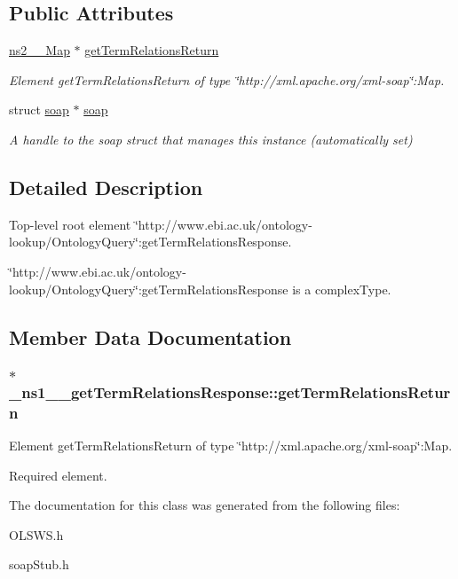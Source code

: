 \subsection*{Public Attributes}
\begin{DoxyCompactItemize}
\item 
\hyperlink{classns2____Map}{ns2\_\-\_\-Map} $\ast$ \hyperlink{class__ns1____getTermRelationsResponse_ad733131f72209f9fa059cc8749f895b4}{getTermRelationsReturn}
\begin{DoxyCompactList}\small\item\em Element getTermRelationsReturn of type \char`\"{}http://xml.apache.org/xml-\/soap\char`\"{}:Map. \end{DoxyCompactList}\item 
\hypertarget{class__ns1____getTermRelationsResponse_a82bf2332fed631a89dd17f31ac99727a}{
struct \hyperlink{class__ns1____getTermRelationsResponse_a82bf2332fed631a89dd17f31ac99727a}{soap} $\ast$ \hyperlink{class__ns1____getTermRelationsResponse_a82bf2332fed631a89dd17f31ac99727a}{soap}}
\label{class__ns1____getTermRelationsResponse_a82bf2332fed631a89dd17f31ac99727a}

\begin{DoxyCompactList}\small\item\em A handle to the soap struct that manages this instance (automatically set) \end{DoxyCompactList}\end{DoxyCompactItemize}


\subsection{Detailed Description}
Top-\/level root element \char`\"{}http://www.ebi.ac.uk/ontology-\/lookup/OntologyQuery\char`\"{}:getTermRelationsResponse. 

\char`\"{}http://www.ebi.ac.uk/ontology-\/lookup/OntologyQuery\char`\"{}:getTermRelationsResponse is a complexType. 

\subsection{Member Data Documentation}
\hypertarget{class__ns1____getTermRelationsResponse_ad733131f72209f9fa059cc8749f895b4}{
\subsubsection[{getTermRelationsReturn}]{ $\ast$ {\bf \_\-ns1\_\-\_\-getTermRelationsResponse::getTermRelationsReturn}}}
\label{class__ns1____getTermRelationsResponse_ad733131f72209f9fa059cc8749f895b4}


Element getTermRelationsReturn of type \char`\"{}http://xml.apache.org/xml-\/soap\char`\"{}:Map. 

Required element. 

The documentation for this class was generated from the following files:\begin{DoxyCompactItemize}
\item 
OLSWS.h\item 
soapStub.h\end{DoxyCompactItemize}
